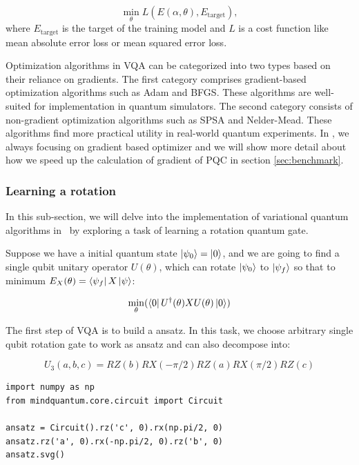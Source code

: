 \begin{equation}
  \min_\theta L(E(\alpha, \theta), E_\text{target}),
\end{equation}
where $E_\text{target}$ is the target of the training model and $L$ is a cost function like mean absolute error loss or mean squared error loss.

Optimization algorithms in VQA can be categorized into two types based on their reliance on gradients. The first category comprises gradient-based optimization algorithms such as Adam and BFGS. These algorithms are well-suited for implementation in quantum simulators. The second category consists of non-gradient optimization algorithms such as SPSA and Nelder-Mead. These algorithms find more practical utility in real-world quantum experiments. In \MindQuantum, we always focusing on gradient based optimizer and we will show more detail about how we speed up the calculation of gradient of PQC in section \ref{sec:benchmark}.

\subsubsection{Learning a rotation}

In this sub-section, we will delve into the implementation of variational quantum algorithms in \MindQuantum\ by exploring a task of learning a rotation quantum gate.

Suppose we have a initial quantum state $\ket{\psi_0}=\ket{0}$, and we are going to find a single qubit unitary operator $U(\theta)$, which can rotate $\ket{\psi_0}$ to $\ket{\psi_f}$ so that to minimum $E_X(\theta) = \bra{\psi_f}X\ket{\psi}$:

\begin{equation}
  \min_\theta(\bra{0}U^\dagger(\theta)XU(\theta)\ket{0})
\end{equation}

The first step of VQA is to build a ansatz. In this task, we choose arbitrary single qubit rotation gate \Uthree to work as ansatz and \Uthree can also decompose into:

\begin{equation}
  U_3(a, b, c) = RZ(b)RX(-\pi/2)RZ(a)RX(\pi/2)RZ(c)
\end{equation}

\begin{lstlisting}
import numpy as np
from mindquantum.core.circuit import Circuit

ansatz = Circuit().rz('c', 0).rx(np.pi/2, 0)
ansatz.rz('a', 0).rx(-np.pi/2, 0).rz('b', 0)
ansatz.svg()
\end{lstlisting}

